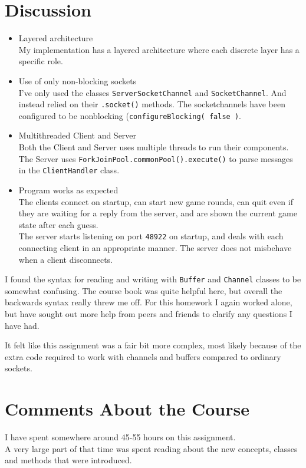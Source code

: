 \documentclass[a4paper]{scrartcl}
\begin{document}
\section{Discussion}

\begin{itemize}
	\item{
		Layered architecture\\
		My implementation has a layered architecture where each discrete layer has a specific role.	
	}
	\item{
		Use of only non-blocking sockets\\
		I've only used the classes \texttt{ServerSocketChannel} and \texttt{SocketChannel}. And instead relied on their \texttt{.socket()} methods. The socketchannels have been configured to be nonblocking (\texttt{configureBlocking( false )}.	
	}
	\item{
		Multithreaded Client and Server\\
		Both the Client and Server uses multiple threads to run their components. The Server uses	\texttt{ForkJoinPool.commonPool().execute()} to parse messages in the \texttt{ClientHandler} class.
	}
	\item{
		Program works as expected\\
		The clients connect on startup, can start new game rounds, can quit even if they are waiting for a reply from the server, and are shown the current game state after each guess.\\
		The server starts listening on port \texttt{48922} on startup, and deals with each connecting client in an appropriate manner. The server does not misbehave when a client disconnects.
	}
\end{itemize}

I found the syntax for reading and writing with \texttt{Buffer} and \texttt{Channel} classes to be somewhat confusing. The course book was quite helpful here, but overall the backwards syntax really threw me off.
For this homework I again worked alone, but have sought out more help from peers and friends to clarify any questions I have had. 

It felt like this assignment was a fair bit more complex, most likely because of the extra code required to work with channels and buffers compared to ordinary sockets.

\section{Comments About the Course}

I have spent somewhere around 45-55 hours on this assignment.\\
A very large part of that time was spent reading about the new concepts, classes and methods that were introduced.
\end{document}
